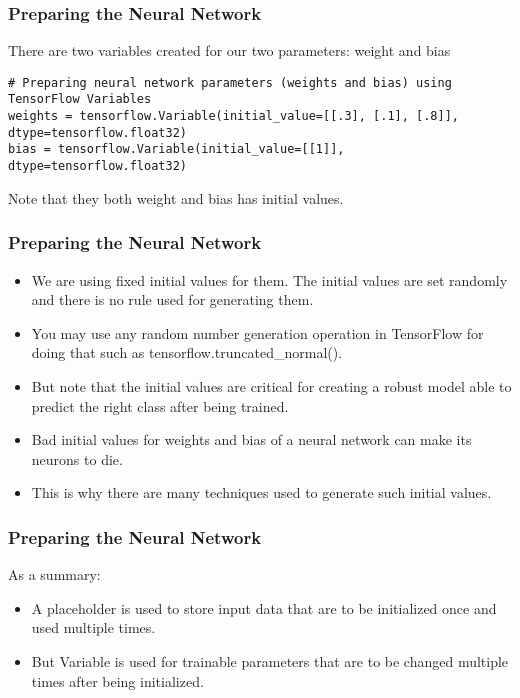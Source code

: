 \begin{frame}[fragile] \frametitle{Preparing the Neural Network }

There are two variables created for our two parameters: weight and bias
\begin{lstlisting}
# Preparing neural network parameters (weights and bias) using TensorFlow Variables  
weights = tensorflow.Variable(initial_value=[[.3], [.1], [.8]], dtype=tensorflow.float32)  
bias = tensorflow.Variable(initial_value=[[1]], dtype=tensorflow.float32)  
\end{lstlisting}
Note that they both weight and bias has initial values. 
\end{frame}

\begin{frame}[fragile] \frametitle{Preparing the Neural Network }

\begin{itemize}
\item We are using fixed initial values for them. The initial values are set randomly and there is no rule used for generating them.
\item You may use any random number generation operation in TensorFlow for doing that such as tensorflow.truncated\_normal().
\item But note that the initial values are critical for creating a robust model able to predict the right class after being trained. 
\item Bad initial values for weights and bias of a neural network can make its neurons to die. 
\item This is why there are many techniques used to generate such initial values.
\end{itemize}

\end{frame}

\begin{frame}[fragile] \frametitle{Preparing the Neural Network }
As a summary:
\begin{itemize}
\item A placeholder is used to store input data that are to be initialized once and used multiple times.
\item But Variable is used for trainable parameters that are to be changed multiple times after being initialized.
\end{itemize}

\end{frame}


